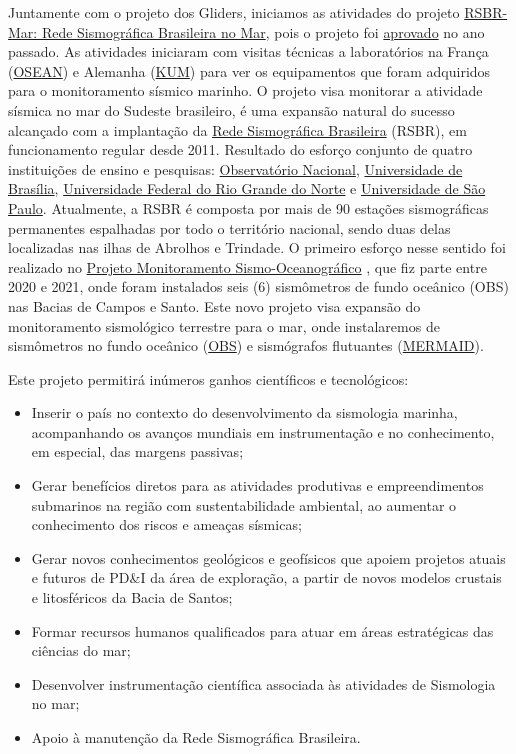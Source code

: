 \documentclass[10pt,a4paper,oneside]{book}
\begin{document}
Juntamente com o projeto dos Gliders, iniciamos as atividades do projeto \href{https://www.facc10.org.br/?page_id=11016\&voltar=10963\&projeto=RSBRMAR\&fonte=C&controle=C&migracao=2022-12-16}{RSBR-Mar: Rede Sismográfica Brasileira no Mar}, pois o projeto foi \href{http://www.finep.gov.br/images/contratos-Adm/2022/dou/Y_S_dias_extrato_contrato.pdf}{aprovado} no ano passado. As atividades iniciaram com visitas técnicas a laboratórios na França (\href{https://www.osean.fr/}{OSEAN}) e Alemanha (\href{https://www.kum-kiel.de/}{KUM}) para ver os equipamentos que foram adquiridos para o monitoramento sísmico marinho. O projeto visa monitorar a atividade sísmica no mar do Sudeste brasileiro, é uma expansão natural do sucesso alcançado com a implantação da \href{www.rsbr.on.br}{Rede Sismográfica Brasileira} (RSBR), em funcionamento regular desde 2011. Resultado do esforço conjunto de quatro instituições de ensino e pesquisas: \href{http://www.rsis.on.br/}{Observatório Nacional}, \href{http://obsis.unb.br/portalsis/}{Universidade de Brasília}, \href{https://labsis.ufrn.br/}{Universidade Federal do Rio Grande do Norte} e \href{https://moho.iag.usp.br/}{Universidade de São Paulo}. Atualmente, a RSBR é composta por mais de 90 estações sismográficas permanentes espalhadas por todo o território nacional, sendo duas delas localizadas nas ilhas de Abrolhos e Trindade. O primeiro esforço nesse sentido foi realizado no \href{https://sismo-oceano.ufsc.br/projeto-obs/}{Projeto Monitoramento Sismo-Oceanográfico} , que fiz parte entre 2020 e 2021, onde foram instalados seis (6) sismômetros de fundo oceânico (OBS) nas Bacias de Campos e Santo. Este novo projeto visa expansão do monitoramento sismológico terrestre para o mar, onde instalaremos de sismômetros no fundo oceânico (\href{https://www.kum-kiel.de/products/nammu.html}{OBS}) e sismógrafos flutuantes (\href{https://www.geoazur.fr/GLOBALSEIS/Mermaid.html}{MERMAID}). 

Este projeto permitirá inúmeros ganhos científicos e tecnológicos:
\begin{itemize}
	\item Inserir o país no contexto do desenvolvimento da sismologia marinha, acompanhando os avanços mundiais em instrumentação e no conhecimento, em especial, das margens passivas;
	\item Gerar benefícios diretos para as atividades produtivas e empreendimentos submarinos na região com sustentabilidade ambiental, ao aumentar o conhecimento dos riscos e ameaças sísmicas;
	\item Gerar novos conhecimentos geológicos e geofísicos que apoiem projetos atuais e futuros de PD\&I da área de exploração, a partir de novos modelos crustais e litosféricos da Bacia de Santos;
	\item Formar recursos humanos qualificados para atuar em áreas estratégicas das ciências do mar;
	\item Desenvolver instrumentação científica associada às atividades de Sismologia no mar;
	\item Apoio à manutenção da Rede Sismográfica Brasileira.
\end{itemize}
\end{document}
